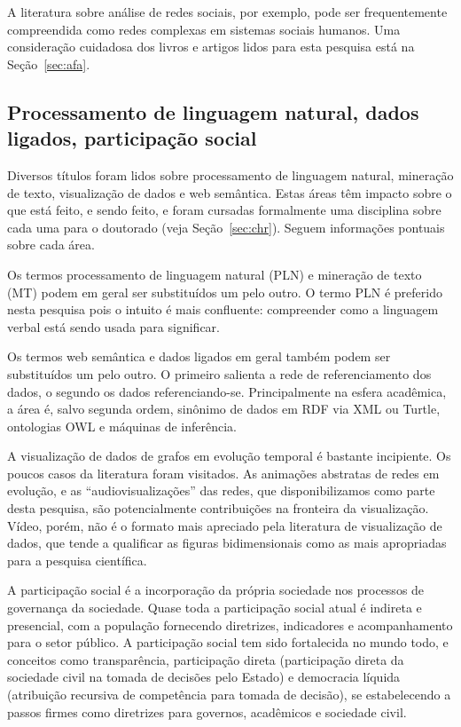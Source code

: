 \documentclass[a4paper,openright,12pt]{report} %
\begin{document}
A literatura sobre análise de redes sociais, por exemplo, pode ser frequentemente compreendida como redes complexas em sistemas sociais humanos.
Uma consideração cuidadosa dos livros e artigos lidos para esta pesquisa está na Seção~\ref{sec:afa}.

\subsection{Processamento de linguagem natural, dados ligados, participação social}\label{sec:misc}
Diversos títulos foram lidos sobre processamento de linguagem natural, mineração de texto,
visualização de dados e web semântica. Estas áreas têm impacto sobre o que está feito, e sendo feito,
e foram cursadas formalmente uma disciplina sobre cada uma para o doutorado (veja Seção~\ref{sec:chr}).
Seguem informações pontuais sobre cada área.

Os termos processamento de linguagem natural (PLN) e mineração de
texto (MT) podem em geral ser substituídos um pelo outro.
O termo PLN é preferido nesta pesquisa pois o intuito é mais confluente: 
compreender como a linguagem verbal está
sendo usada para significar.

Os termos web semântica e dados ligados em geral também podem ser 
substituídos um pelo outro. O primeiro salienta
a rede de referenciamento dos dados,
o segundo os dados referenciando-se. Principalmente na esfera
acadêmica, a área é, salvo segunda ordem, sinônimo de dados em 
RDF via XML ou Turtle, ontologias OWL e máquinas de inferência.

A visualização de dados de grafos em evolução temporal é bastante
incipiente. Os poucos casos da literatura foram visitados. As
animações abstratas de redes em evolução, e as ``audiovisualizações''
das redes, que disponibilizamos como parte desta pesquisa,
são potencialmente contribuições na fronteira da visualização.
Vídeo, porém, não é o formato mais apreciado pela literatura
de visualização de dados, que tende a qualificar as figuras
bidimensionais como as mais apropriadas para a pesquisa
científica.

A participação social é a incorporação da própria sociedade nos 
processos de governança da sociedade.
Quase toda a participação social atual é indireta e presencial, 
com a população fornecendo diretrizes, indicadores e acompanhamento
para o setor público.
A participação social tem sido fortalecida no mundo todo,
e conceitos como transparência, participação direta (participação direta 
da sociedade civil na tomada de decisões pelo Estado) e
democracia líquida (atribuição recursiva de competência para tomada
de decisão), se estabelecendo a passos firmes como diretrizes para
governos, acadêmicos e sociedade civil.
\end{document}
